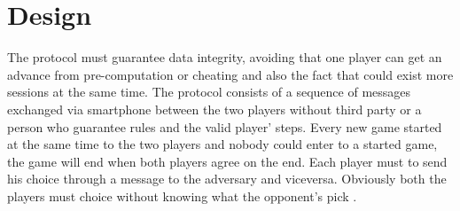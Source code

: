 \documentclass[11pt,a4paper]{article}
\begin{document}
	\section{Design}
		The protocol must guarantee data integrity, avoiding that one player can get an advance from pre-computation or cheating and also the fact that could exist more sessions at the same time. The protocol consists of a sequence of
messages exchanged via smartphone between the two players without third party or a person who guarantee rules and the valid player' steps. Every new game started at the same time to the two players and nobody could enter to a started game, the game will end when both players agree on the end.
Each player must to send his choice through a message to the adversary and viceversa. Obviously both the players must choice without knowing what the opponent's pick .\\

	
\end{document}
